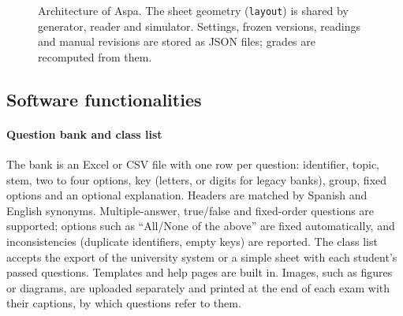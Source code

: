 \documentclass[preprint,12pt, a4paper]{elsarticle}
\begin{document}
\begin{figure}[!htb]
{}
\caption{Architecture of Aspa. The sheet geometry (\texttt{layout}) is shared by generator, reader and simulator. Settings, frozen versions, readings and manual revisions are stored as JSON files; grades are recomputed from them.}
\label{fig:architecture}
\end{figure}

\subsection{Software functionalities}
\label{sec:functionalities}

\paragraph{Question bank and class list} The bank is an Excel or CSV file with one row per question: identifier, topic, stem, two to four options, key (letters, or digits for legacy banks), group, fixed options and an optional explanation. Headers are matched by Spanish and English synonyms. Multiple-answer, true/false and fixed-order questions are supported; options such as ``All/None of the above'' are fixed automatically, and inconsistencies (duplicate identifiers, empty keys) are reported. The class list accepts the export of the university system or a simple sheet with each student's passed questions. Templates and help pages are built in. Images, such as figures or diagrams, are uploaded separately and printed at the end of each exam with their captions, by which questions refer to them.
\end{document}
